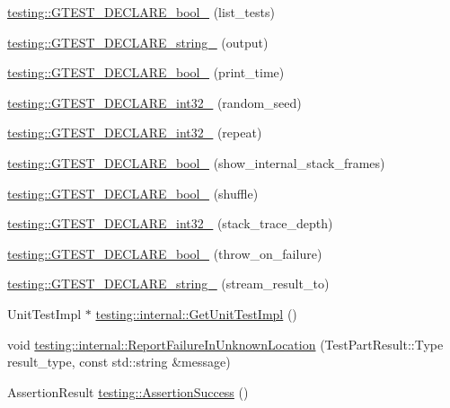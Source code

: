 \begin{DoxyCompactItemize}
\item 
\hyperlink{namespacetesting_af2cd3595c571ca408afc337bc4bb2619}{testing\-::\-G\-T\-E\-S\-T\-\_\-\-D\-E\-C\-L\-A\-R\-E\-\_\-bool\-\_\-} (list\-\_\-tests)
\item 
\hyperlink{namespacetesting_a3fe54dd551f1c36cfdd1b36cd6881a44}{testing\-::\-G\-T\-E\-S\-T\-\_\-\-D\-E\-C\-L\-A\-R\-E\-\_\-string\-\_\-} (output)
\item 
\hyperlink{namespacetesting_aeccefd463a0942da24750e1bbee76041}{testing\-::\-G\-T\-E\-S\-T\-\_\-\-D\-E\-C\-L\-A\-R\-E\-\_\-bool\-\_\-} (print\-\_\-time)
\item 
\hyperlink{namespacetesting_ae754999b59509808254d39e3a3cf38e0}{testing\-::\-G\-T\-E\-S\-T\-\_\-\-D\-E\-C\-L\-A\-R\-E\-\_\-int32\-\_\-} (random\-\_\-seed)
\item 
\hyperlink{namespacetesting_a315ef0647e4f2795bf1705de8e9c9659}{testing\-::\-G\-T\-E\-S\-T\-\_\-\-D\-E\-C\-L\-A\-R\-E\-\_\-int32\-\_\-} (repeat)
\item 
\hyperlink{namespacetesting_af37b9206b938bb8b7d398a1379eb7482}{testing\-::\-G\-T\-E\-S\-T\-\_\-\-D\-E\-C\-L\-A\-R\-E\-\_\-bool\-\_\-} (show\-\_\-internal\-\_\-stack\-\_\-frames)
\item 
\hyperlink{namespacetesting_a6d87f7374e105483905a305328856f4b}{testing\-::\-G\-T\-E\-S\-T\-\_\-\-D\-E\-C\-L\-A\-R\-E\-\_\-bool\-\_\-} (shuffle)
\item 
\hyperlink{namespacetesting_adba6f8afa0f8695956d0134f1629a10b}{testing\-::\-G\-T\-E\-S\-T\-\_\-\-D\-E\-C\-L\-A\-R\-E\-\_\-int32\-\_\-} (stack\-\_\-trace\-\_\-depth)
\item 
\hyperlink{namespacetesting_ac69f2aeeb84dc5f49bd3d040a6f32d17}{testing\-::\-G\-T\-E\-S\-T\-\_\-\-D\-E\-C\-L\-A\-R\-E\-\_\-bool\-\_\-} (throw\-\_\-on\-\_\-failure)
\item 
\hyperlink{namespacetesting_ad4d1ea63037fc21018dbe997cb0041d1}{testing\-::\-G\-T\-E\-S\-T\-\_\-\-D\-E\-C\-L\-A\-R\-E\-\_\-string\-\_\-} (stream\-\_\-result\-\_\-to)
\item 
Unit\-Test\-Impl $\ast$ \hyperlink{namespacetesting_1_1internal_a9bd0caf5d16512de38b39599c13ee634}{testing\-::internal\-::\-Get\-Unit\-Test\-Impl} ()
\item 
void \hyperlink{namespacetesting_1_1internal_a85f6ff0e40f9a5f10af66a73cf1364fa}{testing\-::internal\-::\-Report\-Failure\-In\-Unknown\-Location} (Test\-Part\-Result\-::\-Type result\-\_\-type, const std\-::string \&message)
\item 
Assertion\-Result \hyperlink{namespacetesting_ac1d0baedb17286c5c6c87bd1a45da8ac}{testing\-::\-Assertion\-Success} ()

\end{DoxyCompactItemize}
